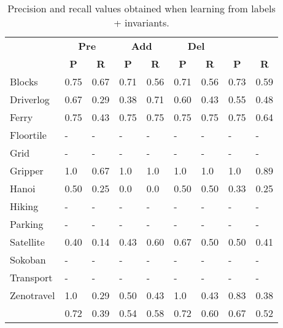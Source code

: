 \documentclass{article}
\begin{document}
\begin{table}
	\begin{scriptsize}
		\begin{center}
			\begin{tabular}{l|l|l|l|l|l|l||l|l|}
				& \multicolumn{2}{|c|}{\bf Pre} & \multicolumn{2}{|c|}{\bf Add} & \multicolumn{2}{|c||}{\bf Del} & \multicolumn{2}{|c}{\bf}\\ \cline{2-9}			
				& \multicolumn{1}{|c|}{\bf P} & \multicolumn{1}{|c|}{\bf R} & \multicolumn{1}{|c|}{\bf P} & \multicolumn{1}{|c|}{\bf R} & \multicolumn{1}{|c|}{\bf P} & \multicolumn{1}{|c||}{\bf R} &  \multicolumn{1}{|c|}{\bf P} & \multicolumn{1}{|c|}{\bf R} \\
				\hline
				Blocks & 0.75 & 0.67 & 0.71 & 0.56 & 0.71 & 0.56 & 0.73 & 0.59 \\
				Driverlog & 0.67 & 0.29 & 0.38 & 0.71 & 0.60 & 0.43 & 0.55 & 0.48 \\
				Ferry & 0.75 & 0.43 & 0.75 & 0.75 & 0.75 & 0.75 & 0.75 & 0.64 \\
				Floortile & - & - & - & - & - & - & - & - \\ %
				Grid & - & - & - & - & - & - & - & - \\ %
				Gripper & 1.0 & 0.67 & 1.0 & 1.0 & 1.0 & 1.0 & 1.0 & 0.89 \\
				Hanoi & 0.50 & 0.25 & 0.0 & 0.0 & 0.50 & 0.50 & 0.33 & 0.25 \\
				Hiking & - & - & - & - & - & - & - & - \\ %
				Parking & - & - & - & - & - & - & - & - \\ %
				Satellite & 0.40 & 0.14 & 0.43 & 0.60 & 0.67 & 0.50 & 0.50 & 0.41 \\
				Sokoban & - & - & - & - & - & - & - & - \\ %
				Transport & - & - & - & - & - & - & - & - \\ %
				Zenotravel & 1.0 & 0.29 & 0.50 & 0.43 & 1.0 & 0.43 & 0.83 & 0.38 \\
				\hline
				\bf  & 0.72 & 0.39 & 0.54 & 0.58 & 0.72 & 0.60 & 0.67 & 0.52 \\
			\end{tabular}
		\end{center}
	\end{scriptsize}
 \caption{\small Precision and recall values obtained when learning from labels + invariants.}
\label{fig:invariants}
\end{table}
\end{document}
